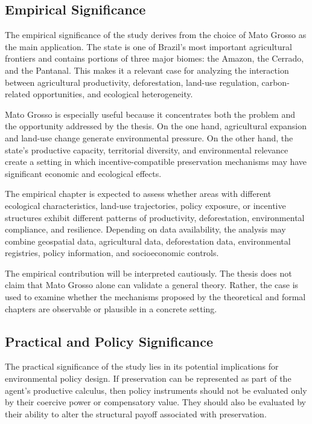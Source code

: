 \subsection{Empirical Significance}

The empirical significance of the study derives from the choice of Mato Grosso as the main application. The state is one of Brazil's most important agricultural frontiers and contains portions of three major biomes: the Amazon, the Cerrado, and the Pantanal. This makes it a relevant case for analyzing the interaction between agricultural productivity, deforestation, land-use regulation, carbon-related opportunities, and ecological heterogeneity.

Mato Grosso is especially useful because it concentrates both the problem and the opportunity addressed by the thesis. On the one hand, agricultural expansion and land-use change generate environmental pressure. On the other hand, the state's productive capacity, territorial diversity, and environmental relevance create a setting in which incentive-compatible preservation mechanisms may have significant economic and ecological effects.

The empirical chapter is expected to assess whether areas with different ecological characteristics, land-use trajectories, policy exposure, or incentive structures exhibit different patterns of productivity, deforestation, environmental compliance, and resilience. Depending on data availability, the analysis may combine geospatial data, agricultural data, deforestation data, environmental registries, policy information, and socioeconomic controls.

The empirical contribution will be interpreted cautiously. The thesis does not claim that Mato Grosso alone can validate a general theory. Rather, the case is used to examine whether the mechanisms proposed by the theoretical and formal chapters are observable or plausible in a concrete setting.

\subsection{Practical and Policy Significance}

The practical significance of the study lies in its potential implications for environmental policy design. If preservation can be represented as part of the agent's productive calculus, then policy instruments should not be evaluated only by their coercive power or compensatory value. They should also be evaluated by their ability to alter the structural payoff associated with preservation.

